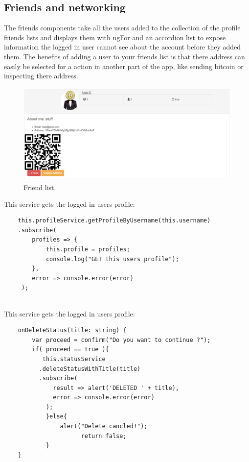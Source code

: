 \subsection{Friends and networking}
The friends components take all the users added to the collection of the profile friends lists and displays them with ngFor and an accordion list to expose information the logged in user cannot see about the account before they added them. The benefits of adding a user to your friends list is that there address can easily be selected for a action in another part of the app, like sending bitcoin or inspecting there address.

\begin{figure}[H]
\centering
\includegraphics[]{img/FriendsList.png}
\caption{Friend list.}
\end{figure}

This service gets the logged in users profile:
\begin{lstlisting}
    this.profileService.getProfileByUsername(this.username)
    .subscribe(
        profiles => {
            this.profile = profiles;
            console.log("GET this users profile");  
        },
        error => console.error(error)
     );
    
\end{lstlisting}

This service gets the logged in users profile:
\begin{lstlisting}
    onDeleteStatus(title: string) {
        var proceed = confirm("Do you want to continue ?");
        if( proceed == true ){
           this.statusService
          .deleteStatusWithTitle(title)
          .subscribe(
              result => alert('DELETED ' + title),
              error => console.error(error)
            );
            }else{
                alert("Delete cancled!");
                      return false;
            }
    }
  
\end{lstlisting}

